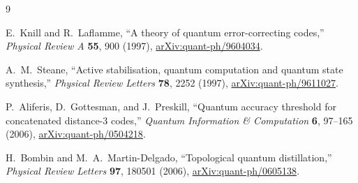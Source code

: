 \documentclass[11pt]{article}
\theoremstyle{remark}
\begin{document}
\begin{thebibliography}{9}

E.~Knill and R.~Laflamme,
``A theory of quantum error-correcting codes,''
\emph{Physical Review A} \textbf{55}, 900 (1997),
\href{https://arxiv.org/abs/quant-ph/9604034}{arXiv:quant-ph/9604034}.

A.~M.~Steane,
``Active stabilisation, quantum computation and quantum state synthesis,''
\emph{Physical Review Letters} \textbf{78}, 2252 (1997),
\href{https://arxiv.org/abs/quant-ph/9611027}{arXiv:quant-ph/9611027}.

P.~Aliferis, D.~Gottesman, and J.~Preskill,
``Quantum accuracy threshold for concatenated distance-3 codes,''
\emph{Quantum Information \& Computation} \textbf{6}, 97--165 (2006),
\href{https://arxiv.org/abs/quant-ph/0504218}{arXiv:quant-ph/0504218}.

H.~Bombin and M.~A.~Martin-Delgado,
``Topological quantum distillation,''
\emph{Physical Review Letters} \textbf{97}, 180501 (2006),
\href{https://arxiv.org/abs/quant-ph/0605138}{arXiv:quant-ph/0605138}.

\end{thebibliography}
\end{document}
